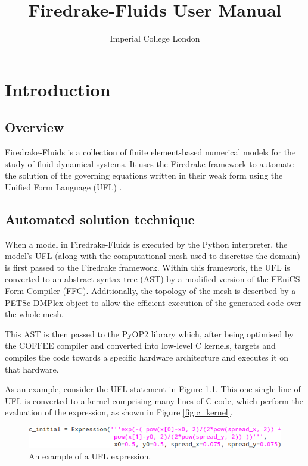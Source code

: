 \documentclass[a4paper,11pt]{report}
\title{Firedrake-Fluids User Manual}
\author{Imperial College London}
\begin{document}
\maketitle
\tableofcontents

\setlength{\parskip}{0.3cm}
\setlength{\parindent}{0cm}

\chapter{Introduction}
\section{Overview}
Firedrake-Fluids is a collection of finite element-based numerical models for the study of fluid dynamical systems. It uses the Firedrake framework \citep{ImperialCollegeLondon_2013, Rathgeber_Submitted} to automate the solution of the governing equations written in their weak form using the Unified Form Language (UFL) \citep{Alnaes_etal_2014}.

\section{Automated solution technique}
When a model in Firedrake-Fluids is executed by the Python interpreter, the model's UFL (along with the computational mesh used to discretise the domain) is first passed to the Firedrake framework. Within this framework, the UFL is converted to an abstract syntax tree (AST) by a modified version of the FEniCS Form Compiler (FFC). Additionally, the topology of the mesh is described by a PETSc DMPlex object to allow the efficient execution of the generated code over the whole mesh.

 This AST is then passed to the PyOP2 library which, after being optimised by the COFFEE compiler and converted into low-level C kernels, targets and compiles the code towards a specific hardware architecture and executes it on that hardware.

As an example, consider the UFL statement in Figure \ref{fig:ufl_expression}. This one single line of UFL is converted to a kernel comprising many lines of C code, which perform the evaluation of the expression, as shown in Figure \ref{fig:c_kernel}.

\begin{figure}
   \centering
   \includegraphics[width=0.75\columnwidth]{images/ufl_expression.png}
   \caption{An example of a UFL expression.}
   \label{fig:ufl_expression}
\end{figure}
\end{document}
